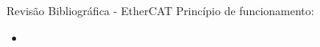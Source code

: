 \begin{frame}{Revis\~{a}o Bibliogr\'{a}fica - EtherCAT}
	Princ\'{i}pio de funcionamento:
	
	\begin{itemize}
		\item 
	\end{itemize}
\end{frame}